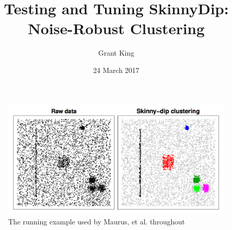 \documentclass{sig-alternate-05-2015}
\begin{document}


\title{Testing and Tuning SkinnyDip: Noise-Robust Clustering}
\author{
%
%
\alignauthor
Grant King\\
}
\date{24 March 2017}

\maketitle

\begin{figure}[t]
\centering
\includegraphics[width=\textwidth]{images/SkinnyDipExample}
\caption{The running example used by Maurus, et al. throughout \cite{skinnydip}}
\label{fig:sdexample}
\end{figure}
\end{document}
